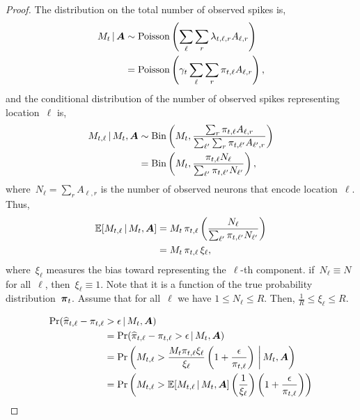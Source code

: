 \begin{proof}
  
  The distribution on the total number 
  of observed spikes is,
  \begin{align}
    M_t \,|\, \boldsymbol{A} &\sim \mathrm{Poisson} \left( \sum_\ell \sum_r \lambda_{t,\ell,r} A_{\ell, r} \right) \\
    &= \mathrm{Poisson} \left(\gamma_t \sum_\ell \sum_r \pi_{t, \ell} A_{\ell, r} \right),
  \end{align}
  and the conditional distribution of the number of observed spikes representing 
  location~$\ell$ is,
  \begin{align}
    M_{t, \ell} \,|\, M_t, \boldsymbol{A} 
    &\sim \mathrm{Bin} \left( M_t, 
      \frac{ \sum_r \pi_{t, \ell} A_{\ell, r}}
      { \sum_{\ell'}  \sum_r  \pi_{t, \ell'} A_{\ell', r}} \right) \\
      &= \mathrm{Bin} \left( M_t,
      \frac{ \pi_{t, \ell} N_\ell}{ \sum_{\ell'}  \pi_{t, \ell'}N_{\ell'}}  \right),
  \end{align} 
  where~$N_\ell=\sum_r A_{\ell, r}$ is the number of observed neurons
  that encode location~$\ell$. Thus,
  \begin{align}
    \mathbb{E}[M_{t,\ell} \,|\, M_t, \boldsymbol{A}] &=
    M_t  \, \pi_{t, \ell}
    \left(\frac{ N_\ell}{ \sum_{\ell'}  \pi_{t, \ell'}N_{\ell'}}\right) \\
    &= M_t \, \pi_{t, \ell} \, \xi_\ell,
  \end{align}
  where~$\xi_\ell$ measures the bias toward representing the~$\ell$-th component.
  if~$N_\ell \equiv N$ for all~$\ell$, then~$\xi_\ell \equiv 1$. Note that it
  is a function of the true probability distribution~$\boldsymbol{\pi}_t$. 
  Assume that for all~$\ell$ we have $1 \leq N_\ell \leq R$. Then,
  $\frac{1}{R} \leq \xi_\ell \leq R$.

  \begin{align}
    \Pr(\widehat{\pi}_{t, \ell} - \pi_{t,\ell}   &> \epsilon \,|\, M_t, \boldsymbol{A}) \\
    &= \Pr(\widehat{\pi}_{t,\ell} - \pi_{t,\ell}  > \epsilon \,|\, M_t, \boldsymbol{A}) \\
    &= \Pr \left(M_{t,\ell} > \frac{M_t \pi_{t, \ell} \xi_\ell}{\xi_\ell} \left(1+\frac{\epsilon}{\pi_{t, \ell}} \right) \, \bigg| \, M_t, \boldsymbol{A} \right)  \\
    &= \Pr \left(M_{t, \ell} > \mathbb{E}[M_{t,\ell} \,|\, M_t, \boldsymbol{A}] \left(
    \frac{1}{\xi_\ell} \right) \left(1+\frac{\epsilon}{\pi_{t, \ell}}
    \right) \right)
  \end{align}


\end{proof}
